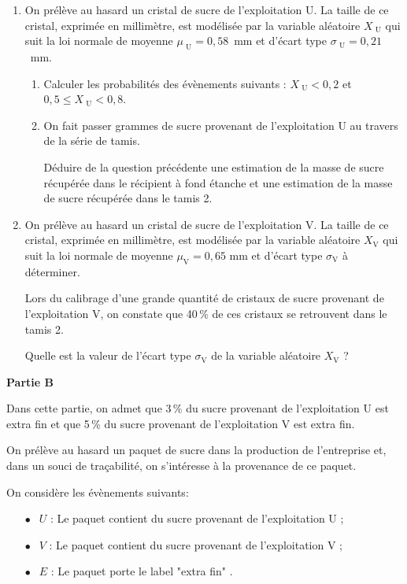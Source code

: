 \documentclass[10pt,a4paper]{article}
\begin{document}
\begin{enumerate}
\item On prélève au hasard un cristal de sucre de l'exploitation U. La taille de ce cristal,
exprimée en millimètre, est modélisée par la variable aléatoire $X_{\text{ U}}$ qui suit la loi normale
de moyenne $\mu_{\text{ U}} = 0,58$~mm et d'écart type $\sigma_{\text{ U}} = 0,21$~mm.
	\begin{enumerate}
	\item Calculer les probabilités des évènements suivants : $X_{\text{ U}} < 0,2$ et $0,5 \leqslant X_{\text{ U}} < 0,8$.
	\item On fait passer  grammes de sucre provenant de l'exploitation U au travers de la
série de tamis.
	
Déduire de la question précédente une estimation de la masse de sucre récupérée dans
le récipient à fond étanche et une estimation de la masse de sucre récupérée dans le
tamis 2.
 		\end{enumerate}
\item On prélève au hasard un cristal de sucre de l'exploitation V. La taille de ce cristal,
exprimée en millimètre, est modélisée par la variable aléatoire $X_{\text{V}}$ qui suit la loi normale
de moyenne $\mu_{\text{V}} = 0,65$ mm et d'écart type $\sigma_{\text{V}}$ à déterminer.

Lors du calibrage d'une grande quantité de cristaux de sucre provenant de l'exploitation V,
on constate que 40\,\% de ces cristaux se retrouvent dans le tamis 2.

Quelle est la valeur de l'écart type $\sigma_{\text{V}}$ de la variable aléatoire $X_{\text{V}}$ ?
\end{enumerate}

\bigskip

\textbf{Partie B}

\medskip

Dans cette partie, on admet que 3\,\% du sucre provenant de l'exploitation U est extra fin et que
5\,\% du sucre provenant de l'exploitation V est extra fin.

On prélève au hasard un paquet de sucre dans la production de l'entreprise et, dans un souci
de traçabilité, on s'intéresse à la provenance de ce paquet.

On considère les évènements suivants:

\setlength\parindent{9mm}
\begin{itemize}
\item[$\bullet~~$] $U$ : \og Le paquet contient du sucre provenant de l'exploitation U \fg{} ;
\item[$\bullet~~$] $V$ : \og Le paquet contient du sucre provenant de l'exploitation V \fg{} ;
\item[$\bullet~~$] $E$ : \og Le paquet porte le label "extra fin" \fg{}.
 \end{itemize}
\setlength\parindent{0mm} 
\end{document}
